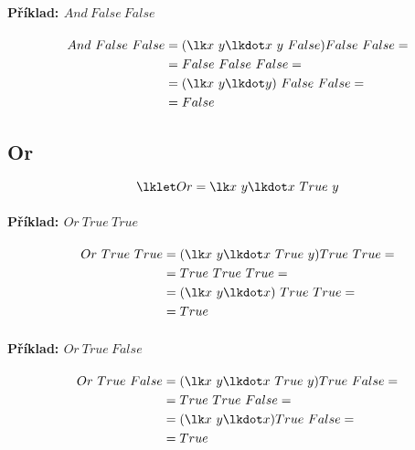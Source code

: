 \paragraph*{Příklad: $And ~ False ~ False$}
\begin{equation}
    \begin{split}
        And ~ False ~ False &= (\lk x ~ y \lkdot x ~ y ~ False) False ~ False = \\
        &= False ~ False ~ False = \\
        &= (\lk x ~ y \lkdot y) ~ False ~ False = \\
        &= False
    \end{split}
\end{equation}

\subsection{Or}

$$ \lklet Or = \lk x ~ y \lkdot x ~ True ~ y $$

\paragraph*{Příklad: $Or ~ True ~ True$}
\begin{equation}
    \begin{split}
        Or ~ True ~ True &= (\lk x ~ y \lkdot x ~ True ~ y) True ~ True = \\
        &= True ~ True ~ True = \\
        &= (\lk x ~ y \lkdot x) ~ True ~ True = \\
        &= True
    \end{split}
\end{equation}

\paragraph*{Příklad: $Or ~ True ~ False$}
\begin{equation}
    \begin{split}
        Or ~ True ~ False &= (\lk x ~ y \lkdot x ~ True ~ y) True ~ False = \\
        &= True ~ True ~ False = \\
        &= (\lk x ~ y \lkdot x) True ~ False = \\
        &= True
    \end{split}
\end{equation}

